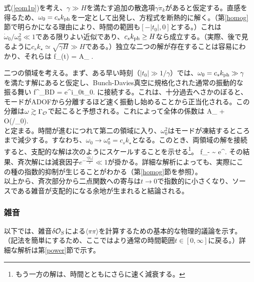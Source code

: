 式(\ref{eom1p})を考え、$\gamma \gg H$を満たす追加の散逸項$\gamma\dot\pi_k$があると仮定する。直感を得るため、$\omega_0 = c_s k_{\rm ph}$を一定として出発し、方程式を断熱的に解く。（第\ref{homog}節で明らかになる理由により、時間の範囲も$[-|t_0|,0]$とする。）これは$\dot\omega_0/\omega_0^2 \ll 1$である限りよい近似であり、$c_s k_{\rm ph} \ge H$なら成立する。（実際、後で見るように$c_s k_\star \simeq \sqrt{\gamma H} \gg H$である。）独立な二つの解が存在することは容易にわかり、それらは
\beq
f_\mp (t) = A_{\mp} \exp{}.
\eeq

二つの領域を考える。まず、ある早い時刻（$|t_0| \gg 1/\gamma$）では、$\omega_0 = c_s k_{\rm ph} \gg \gamma$を満たす解にあると仮定し、Bunch-Davies真空に規格化された通常の振動的な振る舞い
\beq
f^\pm_{\rm BD} =  e^{\pm i\omega_0t_0}.
\eeq
に接続する。これは、十分過去へさかのぼると、モードがADOFから分離するほど速く振動し始めることから正当化される。この分離は$\omega\gtrsim \Gamma_{\cal O}$で起こると予想される。これによって全体の係数は
\beq
\label{anormp}
A_\pm \simeq  {} + O(\gamma/\omega_0).\\
\eeq
と定まる。時間が進むにつれて第二の領域に入り、$\omega^2_0$はモードが凍結するところまで減少する。すなわち、$\omega_0 \to \omega_0^\star = c_s k_\star$となる。このとき、両領域の解を接続すると、支配的な解は次のようにスケールすることを示せる\footnote{もう一方の解は、時間とともにさらに速く減衰する。}。
\beq
\label{fminus}
f_- \sim {} e^{}.
\eeq
その結果、斉次解には減衰因子$e^{-\frac{\gamma |t_0|}{2}} \ll 1$が掛かる。詳細な解析によっても、実際にこの種の指数的抑制が生じることがわかる（第\ref{homog}節を参照）。\\

以上から、斉次部分から二点関数への寄与は$t \to 0$で指数的に小さくなり、ソースである雑音が支配的になる余地が生まれると結論される。

\subsubsection{雑音}\label{noise}

以下では、雑音$\delta{\cal O}_S$による$\langle \pi \pi \rangle$を計算するための基本的な物理的議論を示す。（記法を簡単にするため、ここではより通常の時間範囲$t \in [0,\infty]$に戻る。）詳細な解析は第\ref{power}節で示す。\\

